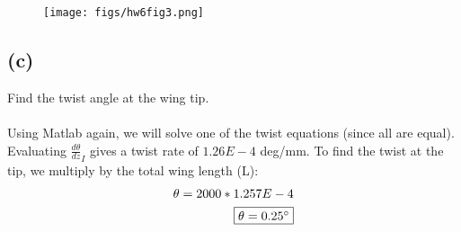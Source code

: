 \documentclass[12 pt]{article}
\begin{document}
\begin{figure}[H]
    \centering
    \texttt{[image: figs/hw6fig3.png]}
\end{figure}

\pagebreak
\subsection*{(c)}
Find the twist angle at the wing tip. \\ \\
Using Matlab again, we will solve one of the twist equations (since all are equal). Evaluating $\frac{d\theta}{dz}_I$
gives a twist rate of $1.26E-4$ deg/mm. To find the twist at the tip, we multiply by the total wing length (L):
\begin{align*}
    \theta=2000*1.257E-4 \\
    \fbox{$\theta=0.25^{\circ}$}
\end{align*}
\end{document}
